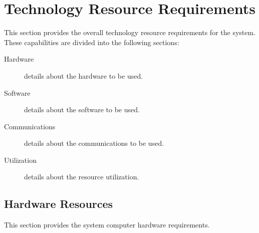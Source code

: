\KNEADSECTIONNEWPAGE
\section{Technology Resource Requirements}
\label{lab:sec_TechnologyResourceRequirements}
% 

This section provides the overall technology resource requirements for the system. 
These capabilities are divided into the following sections:
\begin{description}
	\item[Hardware] details about the hardware to be used. 
	\item[Software] details about the software to be used.
	\item[Communications] details about the communications to be used.
	\item[Utilization] details about the resource utilization.
\end{description}

\KNEADSUBSECTIONNEWPAGE
\subsection{Hardware Resources}
\label{lab:ssec_TechnologyResourceHardware}


This section provides the system computer hardware requirements.


\KNEADSUBSECTIONNEWPAGE
